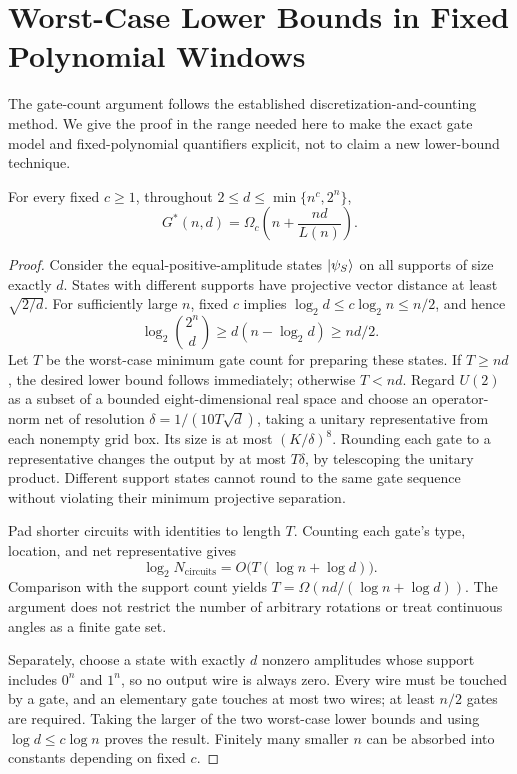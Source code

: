 \section{Worst-Case Lower Bounds in Fixed Polynomial Windows}\label{sec:lower}
The gate-count argument follows the established discretization-and-counting method\cite{liluo2025}. We give the proof in the range needed here to make the exact gate model and fixed-polynomial quantifiers explicit, not to claim a new lower-bound technique.

\begin{lemma}\label{lem:counting}
For every fixed $c\ge1$, throughout $2\le d\le\min\{n^c,2^n\}$,
\[
G^*(n,d)=\Omega_c\left(n+\frac{nd}{L(n)}\right).
\]
\end{lemma}
\begin{proof}
Consider the equal-positive-amplitude states $\lvert \psi_S\rangle$ on all supports of size exactly $d$. States with different supports have projective vector distance at least $\sqrt{2/d}$. For sufficiently large $n$, fixed $c$ implies $\log_2d\le c\log_2n\le n/2$, and hence
\[
\log_2\binom{2^n}{d}\ge d(n-\log_2d)\ge nd/2.
\]
Let $T$ be the worst-case minimum gate count for preparing these states. If $T\ge nd$, the desired lower bound follows immediately; otherwise $T<nd$. Regard $U(2)$ as a subset of a bounded eight-dimensional real space and choose an operator-norm net of resolution $\delta=1/(10T\sqrt d)$, taking a unitary representative from each nonempty grid box. Its size is at most $(K/\delta)^8$. Rounding each gate to a representative changes the output by at most $T\delta$, by telescoping the unitary product. Different support states cannot round to the same gate sequence without violating their minimum projective separation.

Pad shorter circuits with identities to length $T$. Counting each gate's type, location, and net representative gives
\[
\log_2N_{\mathrm{circuits}}=O\bigl(T(\log n+\log d)\bigr).
\]
Comparison with the support count yields $T=\Omega(nd/(\log n+\log d))$. The argument does not restrict the number of arbitrary rotations or treat continuous angles as a finite gate set.

Separately, choose a state with exactly $d$ nonzero amplitudes whose support includes $0^n$ and $1^n$, so no output wire is always zero. Every wire must be touched by a gate, and an elementary gate touches at most two wires; at least $n/2$ gates are required. Taking the larger of the two worst-case lower bounds and using $\log d\le c\log n$ proves the result. Finitely many smaller $n$ can be absorbed into constants depending on fixed $c$.
\end{proof}

